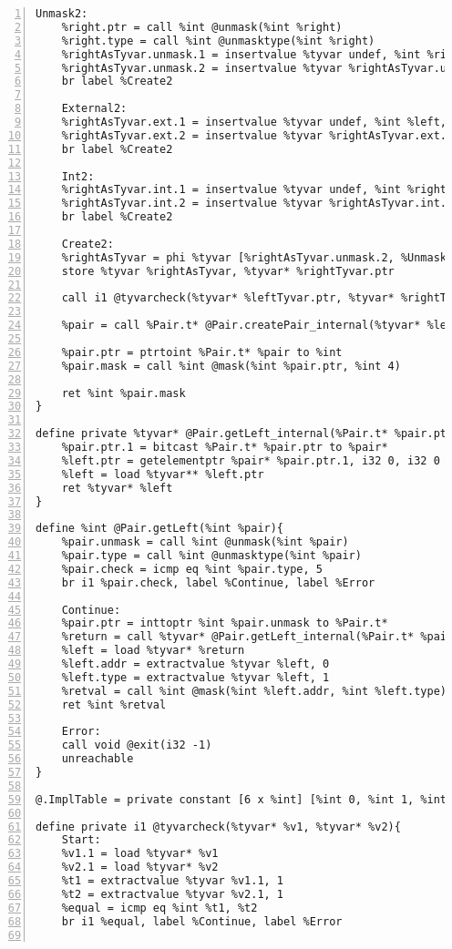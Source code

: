 \begin{lstlisting}[frame=single,numbers=left, language={[x86masm]Assembler}, caption={[Pair Structure: LLVM]Translation of the Pair structure.},
label=llvm:polymorphic]
	Unmask2:
	%right.ptr = call %int @unmask(%int %right)
	%right.type = call %int @unmasktype(%int %right)
	%rightAsTyvar.unmask.1 = insertvalue %tyvar undef, %int %right.ptr, 0
	%rightAsTyvar.unmask.2 = insertvalue %tyvar %rightAsTyvar.unmask.1, %int %right.type, 1
	br label %Create2

	External2:
	%rightAsTyvar.ext.1 = insertvalue %tyvar undef, %int %left, 0
	%rightAsTyvar.ext.2 = insertvalue %tyvar %rightAsTyvar.ext.1, %int 0, 1
	br label %Create2

	Int2:
	%rightAsTyvar.int.1 = insertvalue %tyvar undef, %int %right, 0
	%rightAsTyvar.int.2 = insertvalue %tyvar %rightAsTyvar.int.1, %int 1, 1
	br label %Create2

	Create2:
	%rightAsTyvar = phi %tyvar [%rightAsTyvar.unmask.2, %Unmask2], [%rightAsTyvar.ext.2, %External2], [%rightAsTyvar.int.2,%Int2]
	store %tyvar %rightAsTyvar, %tyvar* %rightTyvar.ptr

	call i1 @tyvarcheck(%tyvar* %leftTyvar.ptr, %tyvar* %rightTyvar.ptr) ; type equation

	%pair = call %Pair.t* @Pair.createPair_internal(%tyvar* %leftTyvar.ptr, %tyvar* %rightTyvar.ptr)

	%pair.ptr = ptrtoint %Pair.t* %pair to %int
	%pair.mask = call %int @mask(%int %pair.ptr, %int 4)

	ret %int %pair.mask
}

define private %tyvar* @Pair.getLeft_internal(%Pair.t* %pair.ptr){
	%pair.ptr.1 = bitcast %Pair.t* %pair.ptr to %pair*
	%left.ptr = getelementptr %pair* %pair.ptr.1, i32 0, i32 0 ;%tyvar**
	%left = load %tyvar** %left.ptr
	ret %tyvar* %left
}

define %int @Pair.getLeft(%int %pair){
	%pair.unmask = call %int @unmask(%int %pair)
	%pair.type = call %int @unmasktype(%int %pair)
	%pair.check = icmp eq %int %pair.type, 5
	br i1 %pair.check, label %Continue, label %Error

	Continue:
	%pair.ptr = inttoptr %int %pair.unmask to %Pair.t*
	%return = call %tyvar* @Pair.getLeft_internal(%Pair.t* %pair.ptr)
	%left = load %tyvar* %return
	%left.addr = extractvalue %tyvar %left, 0
	%left.type = extractvalue %tyvar %left, 1
	%retval = call %int @mask(%int %left.addr, %int %left.type)
	ret %int %retval

	Error:
	call void @exit(i32 -1)
	unreachable
}

@.ImplTable = private constant [6 x %int] [%int 0, %int 1, %int 2, %int 3, %int 4, %int 3]

define private i1 @tyvarcheck(%tyvar* %v1, %tyvar* %v2){
	Start:
	%v1.1 = load %tyvar* %v1
	%v2.1 = load %tyvar* %v2
	%t1 = extractvalue %tyvar %v1.1, 1
	%t2 = extractvalue %tyvar %v2.1, 1
	%equal = icmp eq %int %t1, %t2
	br i1 %equal, label %Continue, label %Error


\end{lstlisting}
